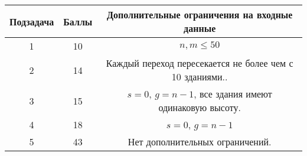 \begin{center}
\renewcommand{\arraystretch}{1.5}
\begin{tabular}{|c|c|c|}
\hline
Подзадача & Баллы & Дополнительные ограничения на входные данные\\
\hline
1 & 10 & $n, m \leq 50$ \\
\hline
2 & 14 & Каждый переход пересекается не более чем с 10 зданиями.. \\
\hline
3 & 15 & $s=0$, $g=n-1$, все здания имеют одинаковую высоту. \\
\hline
4 & 18 & $s=0$, $g=n-1$ \\
\hline
5 & 43 & Нет дополнительных ограничений. \\
\hline
\hline
\end{tabular}
\end{center}